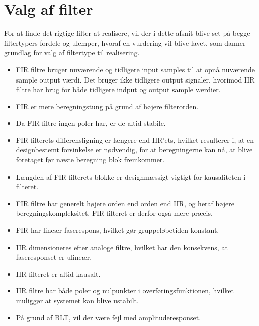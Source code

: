 \section{Valg af filter}\label{sec:dec_filter}
For at finde det rigtige filter at realisere, vil der i dette afsnit blive set på begge filtertypers fordele og ulemper, hvoraf en vurdering vil blive lavet, som danner grundlag for valg af filtertype til realisering.

\begin{itemize}
	\item FIR filtre bruger nuværende og tidligere input samples til at opnå nuværende sample output værdi. Det bruger ikke tidligere output signaler, hvorimod IIR filtre har brug for både tidligere indput og output sample værdier.
	\item FIR er mere beregningstung på grund af højere filterorden.
	\item Da FIR filtre ingen poler har, er de altid stabile.
	\item FIR filterets differensligning er længere end IIR'ets, hvilket resulterer i, at en designbestemt forsinkelse er nødvendig, for at beregningerne kan nå, at blive foretaget før næste beregning blok fremkommer.
	\item Længden af FIR filterets blokke er designmæssigt vigtigt for kausaliteten i filteret.
	\item FIR filtre har generelt højere orden end orden end IIR, og heraf højere beregningskompleksitet. FIR filteret er derfor også mere præcis.	
	\item FIR har lineær faserespons, hvilket gør gruppeløbetiden konstant.
	\item IIR dimensioneres efter analoge filtre, hvilket har den konsekvens, at faseresponset er ulineær.
	\item IIR filteret er altid kausalt.
	\item IIR filtre har både poler og nulpunkter i overføringsfunktionen, hvilket muliggør at systemet kan blive ustabilt.
	\item På grund af BLT, vil der være fejl med amplituderesponset.
\end{itemize}

